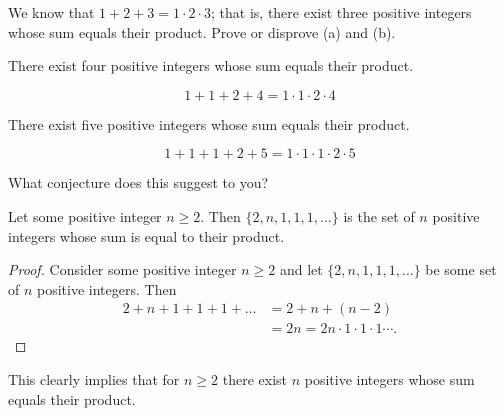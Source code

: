 \documentclass[12pt]{article}
\newenvironment{problem}[2][Problem]{\begin{trivlist}
		\item[\hskip \labelsep {\bfseries #1}\hskip \labelsep {\bfseries #2.}]}{\end{trivlist}}
\newenvironment{solution}[2][Solution]{\begin{trivlist}
		\item[\hskip \labelsep {\bfseries #1}\hskip \labelsep {\bfseries #2.}]}{\end{trivlist}}
\begin{document}
	\begin{problem}{7}
		We know that $1+2+3 = 1\cdot 2\cdot 3$; that is, there exist three positive integers whose sum equals their product. Prove or disprove (a) and (b).
		\begin{enumerate}[label=(\alph*)]
			\item There exist four positive integers whose sum equals their product.
			\begin{solution}{a}
				\[1+1+2+4 = 1\cdot1\cdot2\cdot4\]
			\end{solution}
			\item There exist five positive integers whose sum equals their product.
			\begin{solution}{b}
				\[1+1+1+2+5 = 1\cdot1\cdot1\cdot2\cdot5\]
			\end{solution}
		 
			\item What conjecture does this suggest to you?
			\begin{solution}{c}
				Let some positive integer $n\geq 2$. Then $\{2,n,1,1,1,\ldots\}$ is the set of $n$ positive integers whose sum is equal to their product.
				\begin{proof}
					Consider some positive integer $n\geq 2$  and let $\{2,n,1,1,1,\ldots\}$ be some set of $n$ positive integers. Then 
					\begin{align*}
						2+n+1+1+1+\ldots &= 2+n+(n-2)\\
						&= 2n = 2n\cdot1\cdot1\cdot1\cdots.
					\end{align*}
				\end{proof}
				This clearly implies that for $n\geq 2$ there exist $n$ positive integers whose sum equals their product.
			\end{solution}
		\end{enumerate}
	\end{problem}
\end{document}
